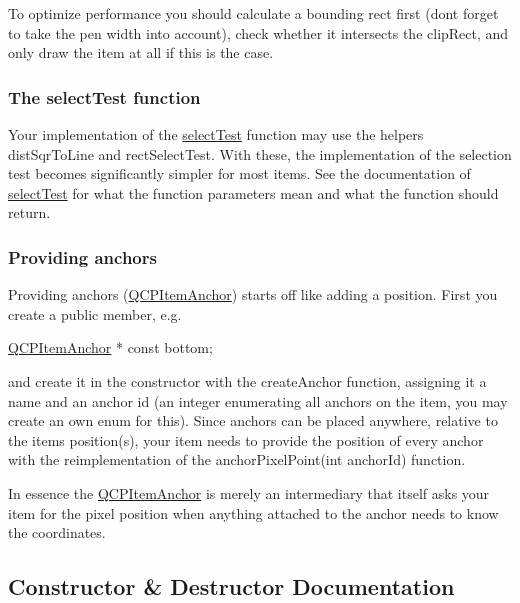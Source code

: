 To optimize performance you should calculate a bounding rect first (don\textquotesingle{}t forget to take the pen width into account), check whether it intersects the clip\+Rect, and only draw the item at all if this is the case.\hypertarget{class_q_c_p_abstract_item_items-selection}{}\subsubsection{The select\+Test function}\label{class_q_c_p_abstract_item_items-selection}
Your implementation of the \hyperlink{class_q_c_p_abstract_item_a96d522d10ffc0413b9a366c6f7f0476b}{select\+Test} function may use the helpers dist\+Sqr\+To\+Line and rect\+Select\+Test. With these, the implementation of the selection test becomes significantly simpler for most items. See the documentation of \hyperlink{class_q_c_p_abstract_item_a96d522d10ffc0413b9a366c6f7f0476b}{select\+Test} for what the function parameters mean and what the function should return.\hypertarget{class_q_c_p_abstract_item_anchors}{}\subsubsection{Providing anchors}\label{class_q_c_p_abstract_item_anchors}
Providing anchors (\hyperlink{class_q_c_p_item_anchor}{Q\+C\+P\+Item\+Anchor}) starts off like adding a position. First you create a public member, e.\+g.


\begin{DoxyCode}
\hyperlink{class_q_c_p_item_anchor}{QCPItemAnchor} * \textcolor{keyword}{const} bottom;
\end{DoxyCode}


and create it in the constructor with the create\+Anchor function, assigning it a name and an anchor id (an integer enumerating all anchors on the item, you may create an own enum for this). Since anchors can be placed anywhere, relative to the item\textquotesingle{}s position(s), your item needs to provide the position of every anchor with the reimplementation of the anchor\+Pixel\+Point(int anchor\+Id) function.

In essence the \hyperlink{class_q_c_p_item_anchor}{Q\+C\+P\+Item\+Anchor} is merely an intermediary that itself asks your item for the pixel position when anything attached to the anchor needs to know the coordinates. 

\subsection{Constructor \& Destructor Documentation}
